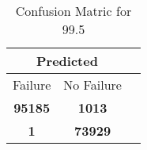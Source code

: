 \begin{table}[] 
\caption{Confusion Matric for 99.5} 
\label{Table: Prediction Accuracy-DMD99.5OnlySunEKF-combinationReflectionEKF-top2perfectNoFailurePrediction-Reflection} 
\centering 
\begin{tabular} 
 {@{}ccc@{}} 
\toprule 
\multicolumn{2}{c}{\textbf{Predicted}}
 \\ \midrule 
\multicolumn{1}{|c|}{Failure} & 
\multicolumn{1}{c|}{No Failure}
 \\ \midrule 
\multicolumn{1}{|c|}{\color{green}\textbf{95185}} & 
\multicolumn{1}{c|}{\color{red}\textbf{1013}}
 \\ \midrule 
\multicolumn{1}{|c|}{\color{red}\textbf{1}} & 
\multicolumn{1}{c|}{\color{green}\textbf{73929}}
 \\ \bottomrule 
\end{tabular} 
\end{table} 
